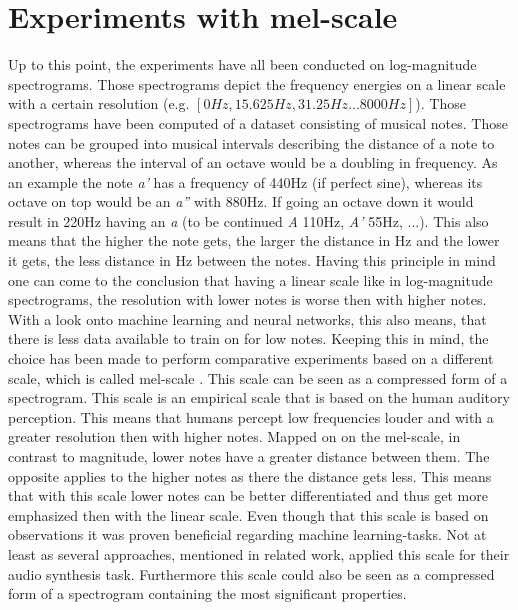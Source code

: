 \section{Experiments with mel-scale}
Up to this point, the experiments have all been conducted on log-magnitude spectrograms. Those spectrograms depict the frequency energies on a linear scale with a certain resolution (e.g. $[0 Hz, 15.625 Hz, 31.25 Hz ... 8000 Hz]$). Those spectrograms have been computed of a dataset consisting of musical notes. Those notes can be grouped into musical intervals describing the distance of a note to another, whereas the interval of an octave would be a doubling in frequency. As an example the note \textit{a'} has a frequency of 440Hz (if perfect sine), whereas its octave on top would be an \textit{a''} with 880Hz. If going an octave down it would result in 220Hz having an \textit{a} (to be continued \textit{A} 110Hz, \textit{A'} 55Hz, ...). This also means that the higher the note gets, the larger the distance in Hz and the lower it gets, the less distance in Hz between the notes. Having this principle in mind one can come to the conclusion that having a linear scale like in log-magnitude spectrograms, the resolution with lower notes is worse then with higher notes. With a look onto machine learning and neural networks, this also means, that there is less data available to train on for low notes.
Keeping this in mind, the choice has been made to perform comparative experiments based on a different scale, which is called mel-scale \cite{stevens1937scale}. This scale can be seen as a compressed form of a spectrogram. This scale is an empirical scale that is based on the human auditory perception. This means that humans percept low frequencies louder and with a greater resolution then with higher notes. Mapped on on the mel-scale, in contrast to magnitude, lower notes have a greater distance between them. The opposite applies to the higher notes as there the distance gets less. This means that with this scale lower notes can be better differentiated and thus get more emphasized then with the linear scale. Even though that this scale is based on observations it was proven beneficial regarding machine learning-tasks. Not at least as several approaches, mentioned in related work, applied this scale for their audio synthesis task. Furthermore this scale could also be seen as a compressed form of a spectrogram containing the most significant properties. 

